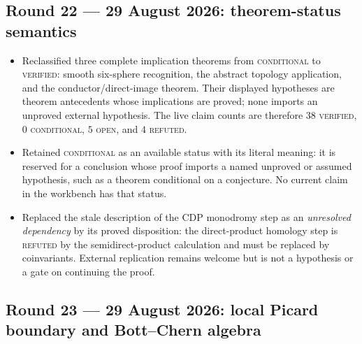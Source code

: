 \subsection*{Round 22 --- 29 August 2026: theorem-status semantics}

\begin{itemize}[leftmargin=1.8em]
\item Reclassified three complete implication theorems from
\textsc{conditional} to \textsc{verified}: smooth six-sphere recognition,
the abstract topology application, and the conductor/direct-image theorem.
Their displayed hypotheses are theorem antecedents whose implications are
proved; none imports an unproved external hypothesis.  The live claim counts
are therefore \(38\) \textsc{verified}, \(0\) \textsc{conditional},
\(5\) \textsc{open}, and \(4\) \textsc{refuted}.
\item Retained \textsc{conditional} as an available status with its literal
meaning: it is reserved for a conclusion whose proof imports a named
unproved or assumed hypothesis, such as a theorem conditional on a
conjecture.  No current claim in the workbench has that status.
\item Replaced the stale description of the CDP monodromy step as an
\emph{unresolved dependency} by its proved disposition: the direct-product
homology step is \textsc{refuted} by the semidirect-product calculation and
must be replaced by coinvariants.  External replication remains welcome but
is not a hypothesis or a gate on continuing the proof.
\end{itemize}

\subsection*{Round 23 --- 29 August 2026: local Picard boundary and Bott--Chern algebra}

